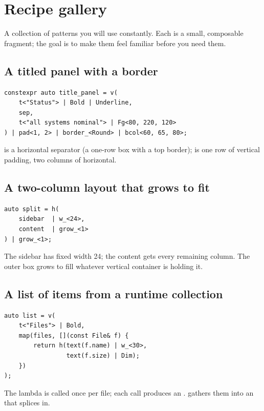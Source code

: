 \section{Recipe gallery}
\label{sec:dsl:recipes}

A collection of patterns you will use constantly. Each is a small,
composable fragment; the goal is to make them feel familiar before
you need them.

\subsection{A titled panel with a border}

\begin{lstlisting}
constexpr auto title_panel = v(
    t<"Status"> | Bold | Underline,
    sep,
    t<"all systems nominal"> | Fg<80, 220, 120>
) | pad<1, 2> | border_<Round> | bcol<60, 65, 80>;
\end{lstlisting}

 is a horizontal separator (a one-row box with a top
border);  is one row of vertical padding, two
columns of horizontal.

\subsection{A two-column layout that grows to fit}

\begin{lstlisting}
auto split = h(
    sidebar  | w_<24>,
    content  | grow_<1>
) | grow_<1>;
\end{lstlisting}

The sidebar has fixed width 24; the content gets every remaining
column. The outer box grows to fill whatever vertical container is
holding it.

\subsection{A list of items from a runtime collection}

\begin{lstlisting}
auto list = v(
    t<"Files"> | Bold,
    map(files, [](const File& f) {
        return h(text(f.name) | w_<30>,
                 text(f.size) | Dim);
    })
);
\end{lstlisting}

The lambda is called once per file; each call produces an
.  gathers them into an 
that  splices in.

